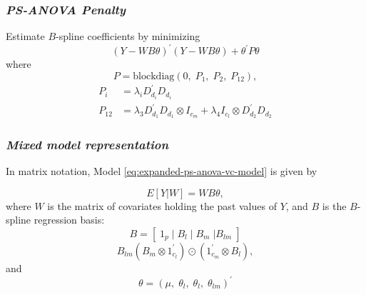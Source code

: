 \documentclass[12pt]{beamer}
\newcommand{\ms}{\scriptscriptstyle}
\begin{document}
\begin{frame}
\frametitle{\emph{PS-ANOVA Penalty}}

Estimate $B$-spline coefficients by minimizing 
\begin{equation*}
\left(Y-WB\theta\right)^\prime \left(Y-WB\theta\right) + \theta^\prime P \theta
\end{equation*}
\noindent
where
\begin{equation} \label{eq:PSANOVA-penalty}
P = \mbox{blockdiag}\left(0,\; P_1, \; P_2, \; P_{12}\right),
\end{equation}
\begin{align*}
P_{\ms i} &= \lambda_i D_{\ms{d_i}}^\prime D_{\ms{d_i}}\\
P_{\ms{12}} &= \lambda_3 D_{\ms{d_1}}^\prime D_{\ms{d_1}} \otimes I_{\ms{c_m}} + \lambda_4 I_{\ms{c_l}} \otimes D_{\ms{d_2}}^\prime D_{\ms{d_2}} 
\end{align*}


\end{frame}



\begin{frame}
\frametitle{\emph{Mixed model representation}}


In matrix notation, Model \ref{eq:expanded-ps-anova-vc-model} is given by

\begin{equation*}  
E \left[ Y | W \right] = WB \theta,
\end{equation*}
\noindent
where $W$ is the matrix of covariates holding the past values of $Y$, and $B$ is the $B$-spline regression basis:
\begin{equation} \label{eq:SANOVA-basis-matrix}
B = \left[\; 1_p \; \vert \;  B_l  \; \vert \;   B_m \; \vert B_{lm} \; \right]
\end{equation}
\noindent
\begin{equation*} \label{eq:rowwise-kronecker-product}
B_{lm} \left( B_m \otimes 1^\prime_{c_l} \right) \odot \left(1^\prime_{c_m} \otimes  B_l  \right),
\end{equation*}
\noindent
and
\begin{equation*} 
\theta = \left(\mu, \;\theta_{\ms l}, \;\theta_{\ms l}, \;\theta_{\ms{lm}} \right)^\prime
\end{equation*}
\end{frame}




\end{document}
